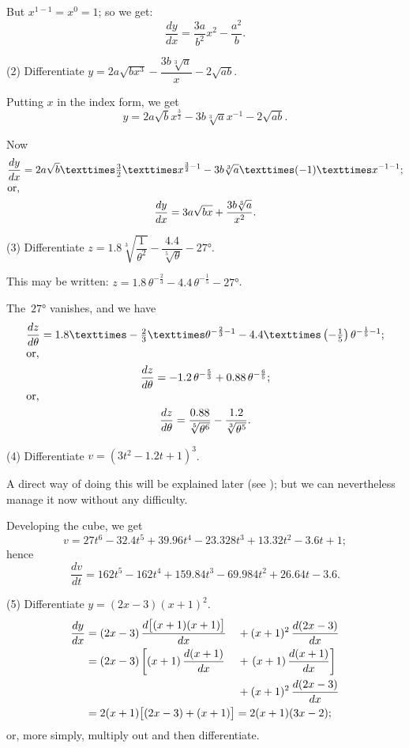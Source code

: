 \documentclass[12pt]{book}[2005/09/16]
\newcommand{\DPPageSep}[2]{\Pagelabel{#2}}
\newcommand{\Pagelabel}[1]
  {\phantomsection\label{#1}}
\newcommand{\Pageref}[2][p.]{%
  \ifthenelse{\not\equal{#1}{}}{%
    \hyperref[#2]{#1~\pageref*{#2}}%
  }{%
    \hyperref[#2]{\pageref{*#2}}%
  }%
}
\newcommand{\efrac}[2]{\frac{#1}{#2}}
\begin{document}
But $x^{1-1} = x^0 = 1$; so we get:
\[
\frac{dy}{dx} = \frac{3a}{b^2} x^2 - \frac{a^2}{b}.
\]

(2) Differentiate $y = 2a\sqrt{bx^3} - \dfrac{3b \sqrt[3]{a}}{x} - 2\sqrt{ab}$.

Putting $x$ in the index form, we get
\[
y = 2a\sqrt{b} x^{\efrac{3}{2}} - 3b \sqrt[3]{a} x^{-1} - 2\sqrt{ab}.
\]

Now
\begin{gather*}
\frac{dy}{dx} = 2a\sqrt{b} × \tfrac{3}{2} × x^{\efrac{3}{2}-1} - 3b\sqrt[3]{a} × (-1) × x^{-1-1}; \\
\intertext{or,}
\frac{dy}{dx} = 3a\sqrt{bx} + \frac{3b\sqrt[3]{a}}{x^2}.
\end{gather*}
\DPPageSep{054.png}{42}%

(3) Differentiate $z = 1.8 \sqrt[3]{\dfrac{1}{\theta^2}} - \dfrac{4.4}{\sqrt[5]{\theta}} - 27°$.

This may be written: $z= 1.8\, \theta^{-\efrac{2}{3}} - 4.4\, \theta^{-\efrac{1}{5}} - 27°$.

The~$27°$ vanishes, and we have
\begin{gather*}
\frac{dz}{d\theta}
  = 1.8 × -\tfrac{2}{3} × \theta^{-\efrac{2}{3}-1}
  - 4.4 × \left(-\tfrac{1}{5}\right)\theta^{-\efrac{1}{5}-1}; \\
\intertext{or,}
\frac{dz}{d\theta}
  = -1.2\, \theta^{-\efrac{5}{3}} + 0.88\, \theta^{-\efrac{6}{5}}; \\
\intertext{or,}
\frac{dz}{d\theta} = \frac{0.88}{\sqrt[5]{\theta^6}}
  - \frac{1.2}{\sqrt[3]{\theta^5}}.
\end{gather*}

(4) Differentiate $v = (3t^2 - 1.2 t + 1)^3$.

A direct way of doing this will be explained later
(see \Pageref{dodge}); but we can nevertheless manage it now
without any difficulty.

Developing the cube, we get
\[
v = 27t^6 - 32.4t^5 + 39.96t^4 - 23.328t^3 + 13.32t^2 - 3.6t + 1; %
\]
hence
\[
\frac{dv}{dt} = 162t^5 - 162t^4 + 159.84t^3 - 69.984t^2 + 26.64t - 3.6.
\]

(5) Differentiate $y = (2x - 3)(x + 1)^2$.
\begin{alignat*}{2}
\frac{dy}{dx}
  &= (2x - 3)\, \frac{d\bigl[(x + 1)(x + 1)\bigr]}{dx}
     &&+ (x + 1)^2\, \frac{d(2x - 3)}{dx} \\
  &= (2x - 3) \left[(x + 1)\, \frac{d(x + 1)}{dx}\right.
     &&+ \left.(x + 1)\, \frac{d(x + 1)}{dx}\right] \\
  &  &&+ (x + 1)^2\, \frac{d(2x - 3)}{dx} \\
  &= \rlap{$2(x + 1)\bigl[(2x - 3) + (x + 1)\bigr] = 2(x + 1)(3x - 2)$;}&&
\end{alignat*}
or, more simply, multiply out and then differentiate.
\DPPageSep{055.png}{43}%
\end{document}
